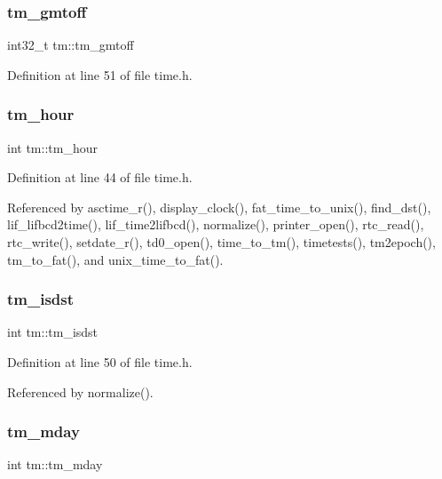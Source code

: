 \subsubsection{\texorpdfstring{tm\+\_\+gmtoff}{tm\_gmtoff}}
{\footnotesize\ttfamily int32\+\_\+t tm\+::tm\+\_\+gmtoff}



Definition at line 51 of file time.\+h.

\mbox{\label{structtm_a3e7ca4e37f1abcaf56b8a916c38eb9fe}} 
\subsubsection{\texorpdfstring{tm\+\_\+hour}{tm\_hour}}
{\footnotesize\ttfamily int tm\+::tm\+\_\+hour}



Definition at line 44 of file time.\+h.



Referenced by asctime\+\_\+r(), display\+\_\+clock(), fat\+\_\+time\+\_\+to\+\_\+unix(), find\+\_\+dst(), lif\+\_\+lifbcd2time(), lif\+\_\+time2lifbcd(), normalize(), printer\+\_\+open(), rtc\+\_\+read(), rtc\+\_\+write(), setdate\+\_\+r(), td0\+\_\+open(), time\+\_\+to\+\_\+tm(), timetests(), tm2epoch(), tm\+\_\+to\+\_\+fat(), and unix\+\_\+time\+\_\+to\+\_\+fat().

\mbox{\label{structtm_a5645ca0580c8ab2c24f6c2965d9c9f9c}} 
\subsubsection{\texorpdfstring{tm\+\_\+isdst}{tm\_isdst}}
{\footnotesize\ttfamily int tm\+::tm\+\_\+isdst}



Definition at line 50 of file time.\+h.



Referenced by normalize().

\mbox{\label{structtm_ab8d8904bad43b0c8b96e61941c5b5310}} 
\subsubsection{\texorpdfstring{tm\+\_\+mday}{tm\_mday}}
{\footnotesize\ttfamily int tm\+::tm\+\_\+mday}



